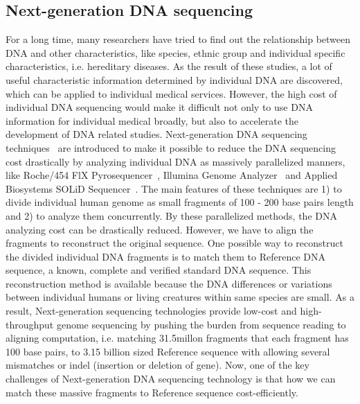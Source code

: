 \subsection{Next-generation DNA sequencing} For a long time, many researchers
have tried to find out the relationship between DNA and other characteristics,
like species, ethnic group and individual specific characteristics, i.e.
hereditary diseases.  As the result of these studies, a lot of useful
characteristic information determined by individual DNA are discovered, which
can be applied to individual medical services. However, the high cost of
individual DNA sequencing would make it difficult not only to use DNA
information for individual medical broadly, but also to accelerate the
development of DNA related studies.  Next-generation DNA sequencing
techniques~\cite{genome_sequence_0, genome_sequence_1, genome_sequence_2,
genome_sequence_3, genome_sequence_4} are introduced to make it possible to
reduce the DNA sequencing cost drastically by analyzing individual DNA as
massively parallelized manners, like Roche/454 FlX
Pyrosequencer~\cite{roche454}, Illumina Genome Analyzer~\cite{illumina} and
Applied Biosystems SOLiD Sequencer~\cite{solid}. The main features of these
techniques are 1) to divide individual human genome as small fragments of 100 -
200 base pairs length and 2) to analyze them concurrently. By these
parallelized methods, the DNA analyzing cost can be drastically reduced.
However, we have to align the fragments to reconstruct the original sequence.
One possible way to reconstruct the divided individual DNA fragments is to match
them to Reference DNA sequence, a known, complete and verified standard DNA sequence.
This reconstruction method is available
because the DNA differences or variations between individual humans or living
creatures within same species are small. As a result, Next-generation sequencing
technologies provide low-cost and high-throughput genome sequencing 
by pushing the burden from sequence reading to aligning computation, i.e. matching 31.5millon
fragments that each fragment has 100 base pairs, to 3.15 billion sized
Reference sequence with allowing several mismatches or indel (insertion or
deletion of gene). Now, one of the key challenges of Next-generation
DNA sequencing technology is that how we can match these massive fragments to
Reference sequence cost-efficiently. \\

